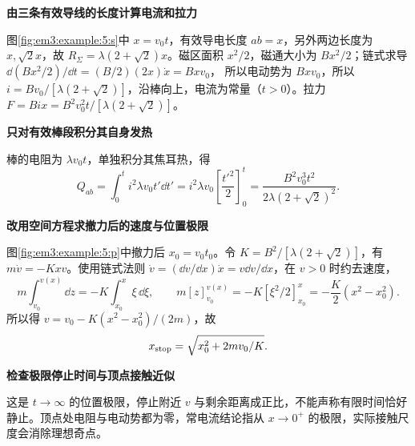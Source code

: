 \begin{solution}\textbf{由三条有效导线的长度计算电流和拉力}\par\nobreak
图\ref{fig:em3:example:5:s}中 $x=v_0t$，有效导电长度 $ab=x$，另外两边长度为 $x,\sqrt2x$，故 $R_\Sigma=\lambda(2+\sqrt2)x$。磁区面积 $x^2/2$，磁通大小为 $Bx^2/2$；链式求导
$\dd(Bx^2/2)/\dd t=(B/2)(2x)\dot x=Bxv_0$，
所以电动势为 $B x v_0$，所以 $i=Bv_0/[\lambda(2+\sqrt2)]$，沿棒向上，电流为常量（$t>0$）。拉力 $F=Bix=B^2v_0^2t/[\lambda(2+\sqrt2)]$。


\par\medskip{}\noindent\textbf{只对有效棒段积分其自身发热}\par\nobreak
棒的电阻为 $\lambda v_0t$，单独积分其焦耳热，得
\[Q_{ab}=\int_0^t i^2\lambda v_0t'\dd t'
=i^2\lambda v_0\left[\frac{t'^2}{2}\right]_0^t
=\frac{B^2v_0^3t^2}{2\lambda(2+\sqrt2)^2}.\]



\par\medskip{}\noindent\textbf{改用空间方程求撤力后的速度与位置极限}\par\nobreak
图\ref{fig:em3:example:5:p}中撤力后 $x_0=v_0t_0$。令 $K=B^2/[\lambda(2+\sqrt2)]$，有 $m\dot v=-Kxv$。使用链式法则 $\dot v=(\dd v/\dd x)\dot x=v\dd v/\dd x$，在 $v>0$ 时约去速度，
\[
 m\int_{v_0}^{v(x)}\dd z=-K\int_{x_0}^{x}\xi\,\dd\xi,
 \qquad m[z]_{v_0}^{v(x)}=-K[\xi^2/2]_{x_0}^x
 =-\frac K2(x^2-x_0^2).
\]
所以得 $v=v_0-K(x^2-x_0^2)/(2m)$，故
\[x_{\rm stop}=\sqrt{x_0^2+2mv_0/K}.\]


\par\medskip{}\noindent\textbf{检查极限停止时间与顶点接触近似}\par\nobreak
这是 $t\to\infty$ 的位置极限，停止附近 $v$ 与剩余距离成正比，不能声称有限时间恰好静止。顶点处电阻与电动势都为零，常电流结论指从 $x\to0^+$ 的极限，实际接触尺度会消除理想奇点。\end{solution}
